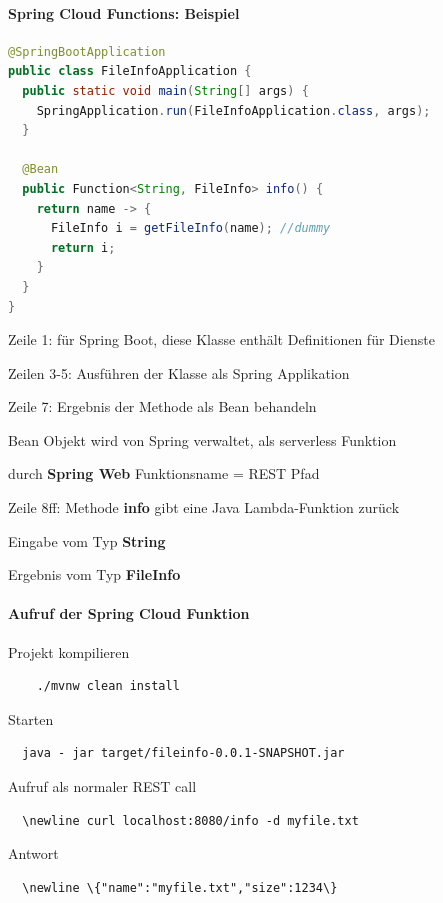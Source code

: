 \documentclass[10pt]{article}
\begin{document}
\paragraph{Spring Cloud Functions: Beispiel}
\begin{lstlisting}[language=java]
@SpringBootApplication
public class FileInfoApplication {
  public static void main(String[] args) {
    SpringApplication.run(FileInfoApplication.class, args);
  }

  @Bean
  public Function<String, FileInfo> info() {
    return name -> {
      FileInfo i = getFileInfo(name); //dummy
      return i;
    }
  }
}
\end{lstlisting}
\begin{itemize*}
  \item Zeile 1: für Spring Boot, diese Klasse enthält Definitionen für Dienste
  \item Zeilen 3-5: Ausführen der Klasse als Spring Applikation
  \item Zeile 7: Ergebnis der Methode als Bean behandeln
  \begin{itemize*}
    \item Bean Objekt wird von Spring verwaltet, als serverless Funktion
    \item durch \textbf{Spring Web} Funktionsname = REST Pfad
  \end{itemize*}
  \item Zeile 8ff: Methode \textbf{info} gibt eine Java Lambda-Funktion zurück
  \begin{itemize*}
    \item Eingabe vom Typ \textbf{String}
    \item Ergebnis vom Typ \textbf{FileInfo}
  \end{itemize*}
\end{itemize*}

\paragraph{Aufruf der Spring Cloud Funktion}

\begin{enumerate*}
  \item Projekt kompilieren
  \begin{lstlisting}
    ./mvnw clean install
  \end{lstlisting}
  \item Starten 
  \begin{lstlisting}
  java - jar target/fileinfo-0.0.1-SNAPSHOT.jar
  \end{lstlisting}
  \item Aufruf als normaler REST call
  \begin{lstlisting}
  \newline curl localhost:8080/info -d myfile.txt
  \end{lstlisting}
  \item Antwort
  \begin{lstlisting}
  \newline \{"name":"myfile.txt","size":1234\}
  \end{lstlisting}
\end{enumerate*}
\end{document}
